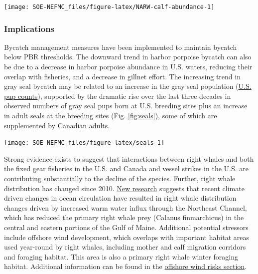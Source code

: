 \documentclass[
  10pt,
]{article}
\let\origfigure\figure
\let\endorigfigure\endfigure
\renewenvironment{figure}[1][2] {
    \expandafter\origfigure\expandafter[H]
} {
    \endorigfigure
}
\begin{document}
\begin{figure}

{\centering \texttt{[image: SOE-NEFMC\_files/figure-latex/NARW-calf-abundance-1]} 

}

\caption{Number of North Atlantic right whale calf births, 1990 - 2021.}\label{fig:NARW-calf-abundance}
\end{figure}

\hypertarget{implications-5}{%
\subsubsection{Implications}\label{implications-5}}

Bycatch management measures have been implemented to maintain bycatch below PBR thresholds. The downward trend in harbor porpoise bycatch can also be due to a decrease in harbor porpoise abundance in U.S. waters, reducing their overlap with fisheries, and a decrease in gillnet effort. The increasing trend in gray seal bycatch may be related to an increase in the gray seal population (\href{https://noaa-edab.github.io/catalog/gray-seal-pups.html}{U.S. pup counts}), supported by the dramatic rise over the last three decades in observed numbers of gray seal pups born at U.S. breeding sites plus an increase in adult seals at the breeding sites (Fig. \ref{fig:seals}), some of which are supplemented by Canadian adults.

\begin{figure}

{\centering \texttt{[image: SOE-NEFMC\_files/figure-latex/seals-1]} 

}

\caption{Estimated mean rates of increase in the number of gray seal pups born at four United States pupping colonies at various times from 1988 to 2021. Recreated from Wood et al. 2022 (Figure 5).}\label{fig:seals}
\end{figure}

Strong evidence exists to suggest that interactions between right whales and both the fixed gear fisheries in the U.S. and Canada and vessel strikes in the U.S. are contributing substantially to the decline of the species. Further, right whale distribution has changed since 2010. \href{https://noaa-edab.github.io/catalog/right-whale-abundance.html}{New research} suggests that recent climate driven changes in ocean circulation have resulted in right whale distribution changes driven by increased warm water influx through the Northeast Channel, which has reduced the primary right whale prey (Calanus finmarchicus) in the central and eastern portions of the Gulf of Maine. Additional potential stressors include offshore wind development, which overlaps with important habitat areas used year-round by right whales, including mother and calf migration corridors and foraging habitat. This area is also a primary right whale winter foraging habitat. Additional information can be found in the \protect\hyperlink{other-ocean-uses:-offshore-wind}{offshore wind risks section}.
\end{document}
